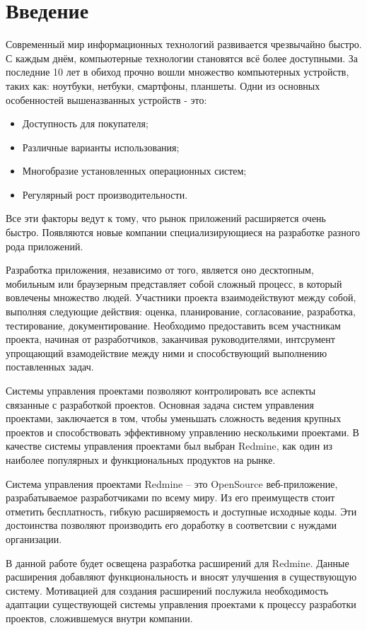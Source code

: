 \chapter{Введение}

Современный мир информационных технологий развивается чрезвычайно быстро. С каждым днём, компьютерные технологии становятся всё более доступными. За последние 10 лет в обиход прочно вошли множество компьютерных устройств, таких как: ноутбуки, нетбуки, смартфоны, планшеты. Одни из основных особенностей вышеназванных устройств - это:
\begin{itemize}
	\item Доступность для покупателя;
	\item Различные варианты использования;
	\item Многобразие установленных операционных систем; 
	\item Регулярный рост производительности. 
\end{itemize} 
Все эти факторы ведут к тому, что рынок приложений расширяется очень быстро. Появляются новые компании специализирующиеся на разработке разного рода приложений.

Разработка приложения, независимо от того, является оно десктопным, мобильным или браузерным представляет собой сложный процесс, в который вовлечены множество людей. Участники проекта взаимодействуют между собой, выполняя следующие действия: оценка, планирование, согласование, разработка, тестирование, документирование. Необходимо предоставить всем участникам проекта, начиная от разработчиков, заканчивая руководителями, интсрумент упрощающий взамодействие между ними и способствующий выполнению поставленных задач.

Системы управления проектами позволяют контролировать все аспекты связанные с разработкой проектов. Основная задача систем управления проектами, заключается в том, чтобы уменьшать сложность ведения крупных проектов и способствовать эффективному управлению несколькими проектами. В качестве системы управления проектами был выбран Redmine, как один из наиболее популярных и функциональных продуктов на рынке.

Система управления проектами Redmine -- это OpenSource веб-приложение, разрабатываемое разработчиками по всему миру. Из его преимуществ стоит отметить бесплатность, гибкую расширяемость и доступные исходные коды. Эти достоинства позволяют производить его доработку в соответсвии с нуждами организации.

В данной работе будет освещена разработка расширений для Redmine. Данные расширения добавляют функциональность и вносят улучшения в существующую систему. Мотивацией для создания расширений послужила необходимость адаптации существующей системы управления проектами к процессу разработки проектов, сложившемуся внутри компании. 

